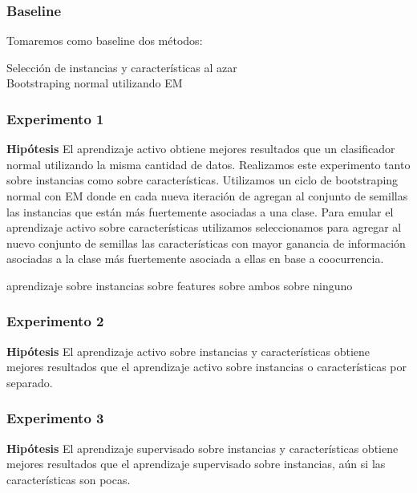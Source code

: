 \subsubsection{Baseline}
Tomaremos como baseline dos métodos:
\begin{description}
    \item[Selección de instancias y características al azar]
    \item[Bootstraping normal utilizando EM]  %
\end{description}


\subsubsection{Experimento 1}
\textbf{Hipótesis} El aprendizaje activo obtiene mejores resultados que un clasificador normal utilizando la misma cantidad de datos.
Realizamos este experimento tanto sobre instancias como sobre características.
Utilizamos un ciclo de bootstraping normal con EM donde en cada nueva iteración de agregan al conjunto de semillas las instancias que están más fuertemente asociadas a una clase.
Para emular el aprendizaje activo sobre características utilizamos seleccionamos para agregar
al nuevo conjunto de semillas las características con mayor ganancia de información asociadas a la clase más fuertemente asociada a ellas en base a coocurrencia. %

aprendizaje sobre instancias
sobre features
sobre ambos
sobre ninguno 

\subsubsection{Experimento 2}
\textbf{Hipótesis} El aprendizaje activo sobre instancias y características obtiene mejores resultados que el aprendizaje activo sobre instancias o características por separado.

\subsubsection{Experimento 3}
\textbf{Hipótesis} El aprendizaje supervisado sobre instancias y características obtiene mejores resultados que el aprendizaje supervisado sobre instancias, aún si las características son pocas.


